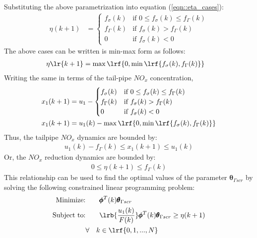 Substituting the above parametrization into equation (\ref{eqn::eta_cases}):
\begin{align}
        \eta(k+1) &=
        \begin{cases}
                f_{\sigma}(k) & \text{if } 0 \leq f_{\sigma}(k) \leq f_{\Gamma}(k)\\
                f_{\Gamma}(k) & \text{if } f_{\sigma}(k) > f_{\Gamma}(k) \\
                0             & \text{if } f_{\sigma}(k) < 0
        \end{cases}
\end{align}
The above cases can be written is min-max form as follows:
\begin{align}
        \eta\lr{k + 1} &= \max \lrf{ 0, \min \lrf{f_{\sigma}(k), f_{\Gamma}(k)}}
\end{align}
Writing the same in terms of the tail-pipe $NO_x$ concentration,
\begin{align}
        x_1(k+1) &= u_1 -
        \begin{cases}
                f_{\sigma}(k) & \text{if } 0 \leq f_{\sigma}(k) \leq f_{\Gamma}(k)\\
                f_{\Gamma}(k) & \text{if } f_{\sigma}(k) > f_{\Gamma}(k) \\
                0             & \text{if } f_{\sigma}(k) < 0
        \end{cases}
        \\
        x_1(k+1) &= u_1(k) - \max \lrf{ 0, \min \lrf{f_{\sigma}(k), f_{\Gamma}(k)}}
\end{align}
Thus, the tailpipe $NO_x$ dynamics are bounded by:
\begin{align}
        u_1(k) - f_{\Gamma}(k) \leq x_1(k+1) \leq u_1(k)
\end{align}
Or, the $NO_x$ reduction dynamics are bounded by:
\begin{align}
        0 \leq \eta(k+1) \leq f_\Gamma(k)
\end{align}
This relationship can be used to find the optimal values of the parameter $\pmb \theta_{\Gamma scr}$ by solving the following constrained linear programming problem:
\begin{align*}
        \text{Minimize:}& \qquad    \pmb \phi^T(k) \pmb \theta_{\Gamma scr}\\
        \text{Subject to:}& \qquad  \lrb{\frac{u_1(k)}{F(k)}} \pmb \phi^T(k) \pmb \theta_{\Gamma scr} \geq \eta(k+1)
        \\
        & \forall \quad k \in \lrf{0, 1, ..., N}
\end{align*}
\begin{align}
        \label{eqn::optimization_prob}
\end{align}
